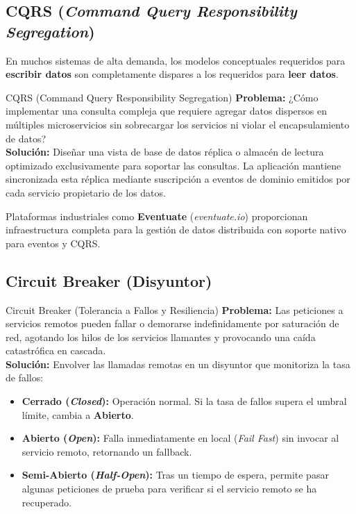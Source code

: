 \subsection{CQRS (\emph{Command Query Responsibility Segregation})}

En muchos sistemas de alta demanda, los modelos conceptuales requeridos para \textbf{escribir datos} son completamente dispares a los requeridos para \textbf{leer datos}.

\begin{patronarquitectura}{CQRS (Command Query Responsibility Segregation)}
\textbf{Problema:} ¿Cómo implementar una consulta compleja que requiere agregar datos dispersos en múltiples microservicios sin sobrecargar los servicios ni violar el encapsulamiento de datos?\\
\textbf{Solución:} Diseñar una vista de base de datos réplica o almacén de lectura optimizado exclusivamente para soportar las consultas. La aplicación mantiene sincronizada esta réplica mediante suscripción a eventos de dominio emitidos por cada servicio propietario de los datos.
\end{patronarquitectura}

Plataformas industriales como \textbf{Eventuate} (\emph{eventuate.io}) proporcionan infraestructura completa para la gestión de datos distribuida con soporte nativo para eventos y CQRS.

\subsection{Circuit Breaker (Disyuntor)}

\begin{patronarquitectura}{Circuit Breaker (Tolerancia a Fallos y Resiliencia)}
\textbf{Problema:} Las peticiones a servicios remotos pueden fallar o demorarse indefinidamente por saturación de red, agotando los hilos de los servicios llamantes y provocando una caída catastrófica en cascada.\\
\textbf{Solución:} Envolver las llamadas remotas en un disyuntor que monitoriza la tasa de fallos:
\begin{itemize}[leftmargin=1.2em]
  \item \textbf{Cerrado (\emph{Closed}):} Operación normal. Si la tasa de fallos supera el umbral límite, cambia a \textbf{Abierto}.
  \item \textbf{Abierto (\emph{Open}):} Falla inmediatamente en local (\emph{Fail Fast}) sin invocar al servicio remoto, retornando un fallback.
  \item \textbf{Semi-Abierto (\emph{Half-Open}):} Tras un tiempo de espera, permite pasar algunas peticiones de prueba para verificar si el servicio remoto se ha recuperado.
\end{itemize}
\end{patronarquitectura}


